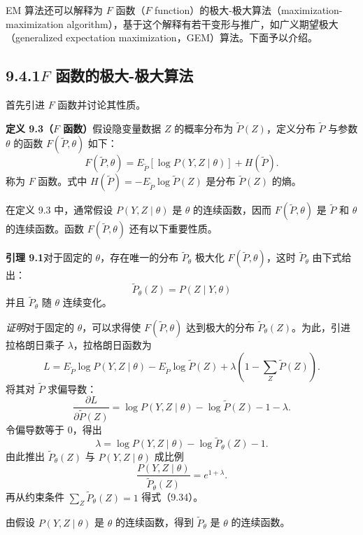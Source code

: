 \documentclass[UTF8,12pt,a4paper,fontset=fandol]{ctexart}
\begin{document}
EM 算法还可以解释为 $F$ 函数（$F$ function）的极大-极大算法（maximization-maximization algorithm），基于这个解释有若干变形与推广，如广义期望极大（generalized expectation maximization，GEM）算法。下面予以介绍。

\subsection*{9.4.1\quad $F$ 函数的极大-极大算法}

首先引进 $F$ 函数并讨论其性质。

\noindent\textbf{定义 9.3（$F$ 函数）}\quad 假设隐变量数据 $Z$ 的概率分布为 $\tilde{P}(Z)$，定义分布 $\tilde{P}$ 与参数 $\theta$ 的函数 $F(\tilde{P},\theta)$ 如下：
\begin{equation}
  F(\tilde{P},\theta)=E_{\tilde{P}}[\log P(Y,Z\mid\theta)]+H(\tilde{P}).
  \tag{9.33}
\end{equation}
称为 $F$ 函数。式中 $H(\tilde{P})=-E_{\tilde{P}}\log\tilde{P}(Z)$ 是分布 $\tilde{P}(Z)$ 的熵。

在定义 9.3 中，通常假设 $P(Y,Z\mid\theta)$ 是 $\theta$ 的连续函数，因而 $F(\tilde{P},\theta)$ 是 $\tilde{P}$ 和 $\theta$ 的连续函数。函数 $F(\tilde{P},\theta)$ 还有以下重要性质。

\noindent\textbf{引理 9.1}\quad 对于固定的 $\theta$，存在唯一的分布 $\tilde{P}_\theta$ 极大化 $F(\tilde{P},\theta)$，这时 $\tilde{P}_\theta$ 由下式给出：
\begin{equation}
  \tilde{P}_{\theta}(Z)=P(Z\mid Y,\theta)
  \tag{9.34}
\end{equation}
并且 $\tilde{P}_{\theta}$ 随 $\theta$ 连续变化。

\noindent\textit{证明}\quad 对于固定的 $\theta$，可以求得使 $F(\tilde{P},\theta)$ 达到极大的分布 $\tilde{P}_{\theta}(Z)$。为此，引进拉格朗日乘子 $\lambda$，拉格朗日函数为
\begin{equation}
  L=E_{\tilde{P}}\log P(Y,Z\mid\theta)-E_{\tilde{P}}\log\tilde{P}(Z)
  +\lambda\left(1-\sum_Z\tilde{P}(Z)\right).
  \tag{9.35}
\end{equation}
将其对 $\tilde{P}$ 求偏导数：
\[
  \frac{\partial L}{\partial\tilde{P}(Z)}
  =\log P(Y,Z\mid\theta)-\log\tilde{P}(Z)-1-\lambda.
\]
令偏导数等于 0，得出
\[
  \lambda=\log P(Y,Z\mid\theta)-\log\tilde{P}_{\theta}(Z)-1.
\]
由此推出 $\tilde{P}_{\theta}(Z)$ 与 $P(Y,Z\mid\theta)$ 成比例
\[
  \frac{P(Y,Z\mid\theta)}{\tilde{P}_{\theta}(Z)}=e^{1+\lambda}.
\]
再从约束条件 $\sum_Z\tilde{P}_{\theta}(Z)=1$ 得式（9.34）。

由假设 $P(Y,Z\mid\theta)$ 是 $\theta$ 的连续函数，得到 $\tilde{P}_{\theta}$ 是 $\theta$ 的连续函数。
\end{document}
